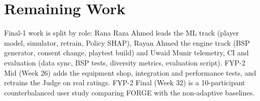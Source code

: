 \section*{Remaining Work}
Final-1 work is split by role: Rana Raza Ahmed leads the ML track (player model, simulator, retrain, Policy SHAP), Rayan Ahmed the engine track (BSP generator, consent change, playtest build) and Uwaid Munir telemetry, CI and evaluation (data sync, BSP tests, diversity metrics, evaluation script). FYP-2 Mid (Week 26) adds the equipment shop, integration and performance tests, and retrains the Judge on real ratings. FYP-2 Final (Week 32) is a 10-participant counterbalanced user study comparing FORGE with the non-adaptive baselines.
